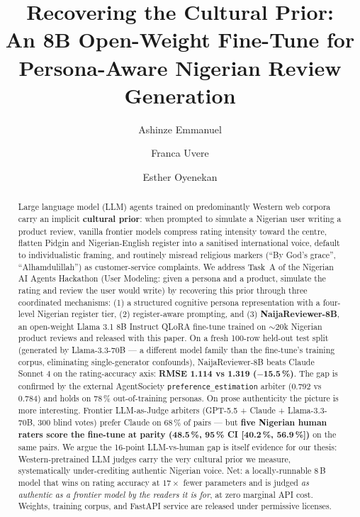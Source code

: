 \documentclass[sigconf,nonacm,balance]{acmart}
\title{Recovering the Cultural Prior:\\
       An 8B Open-Weight Fine-Tune for Persona-Aware Nigerian Review Generation}
\author{Ashinze Emmanuel}
\affiliation{\institution{International University of Applied Sciences}\country{Germany}}
\author{Franca Uvere}
\affiliation{\institution{University of Lagos}\country{Nigeria}}
\author{Esther Oyenekan}
\affiliation{\institution{MIVA Open University}\country{Nigeria}}
\begin{document}
\begin{abstract}
Large language model (LLM) agents trained on predominantly Western web corpora
carry an implicit \textbf{cultural prior}: when prompted to simulate a
Nigerian user writing a product review, vanilla frontier models compress
rating intensity toward the centre, flatten Pidgin and Nigerian-English
register into a sanitised international voice, default to individualistic
framing, and routinely misread religious markers (``By God's grace'',
``Alhamdulillah'') as customer-service complaints. We address Task~A of the
Nigerian AI Agents Hackathon (User Modeling: given a persona and a product,
simulate the rating and review the user would write) by recovering this
prior through three coordinated mechanisms: (1) a structured cognitive
persona representation with a four-level Nigerian register tier,
(2) register-aware prompting, and (3) \textbf{NaijaReviewer-8B}, an
open-weight Llama 3.1 8B Instruct QLoRA fine-tune trained on
$\sim$20k Nigerian product reviews and released with this paper.
On a fresh 100-row held-out test split (generated by Llama-3.3-70B ---
a different model family than the fine-tune's training corpus, eliminating
single-generator confounds), NaijaReviewer-8B beats Claude Sonnet 4 on the
rating-accuracy axis: \textbf{RMSE 1.114 vs 1.319 ($-$15.5\,\%)}. The gap is
confirmed by the external AgentSociety \texttt{preference\_estimation}
arbiter (0.792 vs 0.784) and holds on 78\,\% out-of-training personas.
On prose authenticity the picture is more interesting. Frontier
LLM-as-Judge arbiters (GPT-5.5 + Claude + Llama-3.3-70B, 300 blind
votes) prefer Claude on 68\,\% of pairs --- but \textbf{five Nigerian
human raters score the fine-tune at parity (48.5\,\%, 95\,\% CI
[40.2\,\%, 56.9\,\%])} on the same pairs. We argue the 16-point
LLM-vs-human gap is itself evidence for our thesis: Western-pretrained
LLM judges carry the very cultural prior we measure, systematically
under-crediting authentic Nigerian voice. Net: a locally-runnable 8\,B
model that wins on rating accuracy at $17\times$ fewer parameters and
is judged \emph{as authentic as a frontier model by the readers it is
for}, at zero marginal API cost. Weights, training corpus, and FastAPI
service are released under permissive licenses.
\end{abstract}

\maketitle

\end{document}
